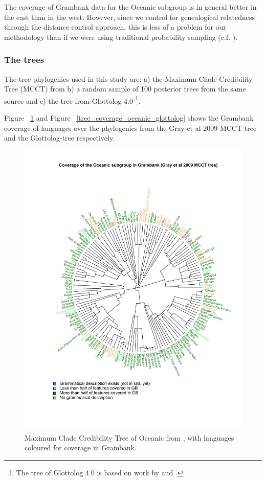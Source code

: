 \documentclass[a4paper,10pt]{article} %
\begin{document}
The coverage of Grambank data for the Oceanic subgroup is in general better in the east than in the west. However, since we control for genealogical relatedness through the distance control approach, this is less of a problem for our methodology than if we were using traditional probability sampling (c.f. \citet{ross2004morphosyntactic}).

\subsubsection{The trees}
The tree phylogenies used in this study are: a) the Maximum Clade Credibility Tree (MCCT) from \citet{grayetal_2009} b) a random sample of 100 posterior trees from the same source and c) the tree from Glottolog 4.0 \footnote{The tree of Glottolog 4.0 \citep{glottolog40} is based on work by \citet{blust_2009, blust_2014} and \citet{blust_chen_2017}.}. 

Figure ~\ref{tree_coverage_oceanic_gray} and Figure ~\ref{tree_coverage_oceanic_glottolog} shows the Grambank coverage of languages over the phylogenies from the Gray et al 2009-MCCT-tree and the Glottolog-tree respectively. 

\begin{figure}[H]
\centering
\includegraphics[width=\textwidth]{illustrations/plots_from_R/coverage_plots/tree/Oceanic_tree_desc_status_gray_et_al_tree_mcct.png}
\caption{{Maximum Clade Credibility Tree of Oceanic from \citet{grayetal_2009}, with languages coloured for coverage in Grambank.}}
\label{tree_coverage_oceanic_gray}
\end{figure}
\end{document}
